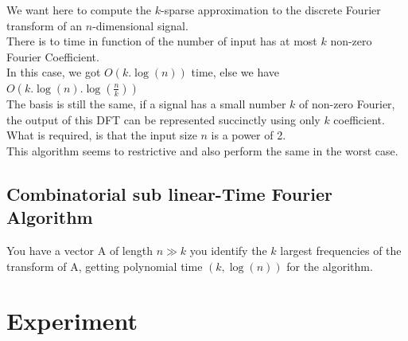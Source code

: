 \documentclass{article}
\begin{document}
We want here to compute the $k$-sparse approximation to the discrete Fourier transform of an $n$-dimensional signal.\\
There is to time in function of the number of input has at most $k$ non-zero Fourier Coefficient.\\
In this case, we got $O(k.\log(n))$ time, else we have $O(k.\log(n).\log(\frac{n}{k}))$\\
The basis is still the same, if a signal has a small number $k$ of non-zero Fourier, the output of this DFT can be represented succinctly using only $k$ coefficient.\\
What is required, is that the input size $n$ is a power of 2.\\
This algorithm seems to restrictive and also perform the same in the worst case.\\

\subsection{Combinatorial sub linear-Time Fourier Algorithm}

You have a vector A of length $n \gg k$ you identify the $k$ largest frequencies of the transform of A, getting polynomial time $(k,\log(n))$ for the algorithm.\\

\section{Experiment}
\end{document}
